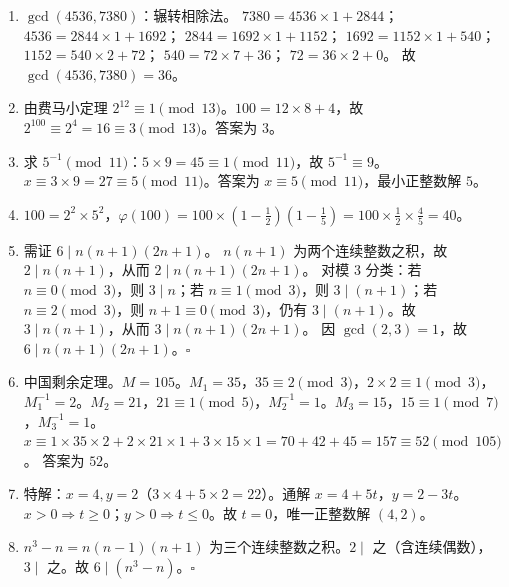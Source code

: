 \documentclass[12pt, a4paper]{ctexart}
\begin{document}
\begin{knowledgebox}[参考答案]
\begin{enumerate}
  \item $\gcd(4536, 7380)$：辗转相除法。
  $7380 = 4536 \times 1 + 2844$；
  $4536 = 2844 \times 1 + 1692$；
  $2844 = 1692 \times 1 + 1152$；
  $1692 = 1152 \times 1 + 540$；
  $1152 = 540 \times 2 + 72$；
  $540 = 72 \times 7 + 36$；
  $72 = 36 \times 2 + 0$。
  故 $\gcd(4536, 7380) = \boxed{36}$。

  \item 由费马小定理 $2^{12} \equiv 1 \pmod{13}$。$100 = 12 \times 8 + 4$，故 $2^{100} \equiv 2^4 = 16 \equiv 3 \pmod{13}$。答案为 $\boxed{3}$。

  \item 求 $5^{-1} \pmod{11}$：$5 \times 9 = 45 \equiv 1 \pmod{11}$，故 $5^{-1} \equiv 9$。$x \equiv 3 \times 9 = 27 \equiv 5 \pmod{11}$。答案为 $\boxed{x \equiv 5 \pmod{11}}$，最小正整数解 $5$。

  \item $100 = 2^2 \times 5^2$，$\varphi(100) = 100 \times (1 - \tfrac{1}{2})(1 - \tfrac{1}{5}) = 100 \times \tfrac{1}{2} \times \tfrac{4}{5} = \boxed{40}$。

  \item 需证 $6 \mid n(n+1)(2n+1)$。
  $n(n+1)$ 为两个连续整数之积，故 $2 \mid n(n+1)$，从而 $2 \mid n(n+1)(2n+1)$。
  对模 $3$ 分类：若 $n \equiv 0 \pmod{3}$，则 $3 \mid n$；若 $n \equiv 1 \pmod{3}$，则 $3 \mid (n+1)$；若 $n \equiv 2 \pmod{3}$，则 $n+1 \equiv 0 \pmod{3}$，仍有 $3 \mid (n+1)$。故 $3 \mid n(n+1)$，从而 $3 \mid n(n+1)(2n+1)$。
  因 $\gcd(2, 3) = 1$，故 $6 \mid n(n+1)(2n+1)$。$\square$

  \item 中国剩余定理。$M = 105$。$M_1 = 35$，$35 \equiv 2 \pmod{3}$，$2 \times 2 \equiv 1 \pmod{3}$，$M_1^{-1} = 2$。$M_2 = 21$，$21 \equiv 1 \pmod{5}$，$M_2^{-1} = 1$。$M_3 = 15$，$15 \equiv 1 \pmod{7}$，$M_3^{-1} = 1$。
  $x \equiv 1 \times 35 \times 2 + 2 \times 21 \times 1 + 3 \times 15 \times 1 = 70 + 42 + 45 = 157 \equiv 52 \pmod{105}$。
  答案为 $\boxed{52}$。

  \item 特解：$x = 4, y = 2$（$3 \times 4 + 5 \times 2 = 22$）。通解 $x = 4 + 5t$，$y = 2 - 3t$。$x > 0 \Rightarrow t \geqslant 0$；$y > 0 \Rightarrow t \leqslant 0$。故 $t = 0$，唯一正整数解 $\boxed{(4, 2)}$。

  \item $n^3 - n = n(n-1)(n+1)$ 为三个连续整数之积。$2 \mid$ 之（含连续偶数），$3 \mid$ 之。故 $6 \mid (n^3 - n)$。$\square$


\end{enumerate}
\end{knowledgebox}
\end{document}
